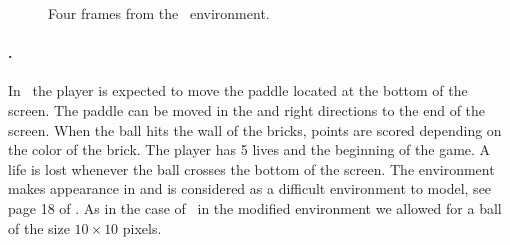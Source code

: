 \begin{figure}[H]
%
\caption{Four frames from the \pong\ environment. }
\label{fig:pong_original}
\end{figure}


\paragraph{\breakout.} In \breakout\ the player is expected to move the paddle located at the bottom of the screen. The paddle can be moved in the and right directions to the end of the screen. When the ball hits the wall of the bricks, points are scored depending on the color of the brick. The player has 5 lives and the beginning of the game. A life is lost whenever the ball crosses the bottom of the screen.  The environment makes appearance in \cite{recurrent} and is considered as a difficult environment to model, see page 18 of \cite{recurrent}. As in the case of \pong\ in the modified environment we allowed for a ball of the size $10\times 10$ pixels.

